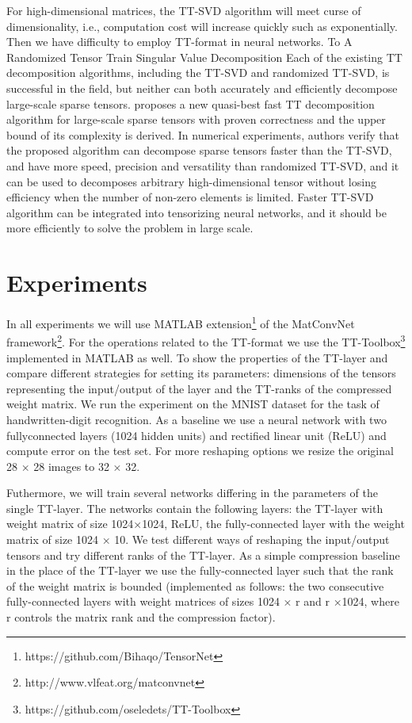 \documentclass[onecolumn, conference]{IEEEtran}
\begin{document}
\par For high-dimensional matrices, the TT-SVD algorithm will meet curse of dimensionality, i.e., computation cost will increase quickly such as exponentially. Then we have difficulty to employ TT-format in neural networks. To 
A Randomized Tensor Train Singular Value
Decomposition
Each of the existing TT decomposition algorithms,
including the TT-SVD and randomized TT-SVD, is successful in the field, but
neither can both accurately and efficiently decompose large-scale sparse tensors. \cite{b13} proposes a new quasi-best fast TT
decomposition algorithm for large-scale sparse tensors with proven correctness
and the upper bound of its complexity is derived. In numerical experiments,
authors verify that the proposed algorithm can decompose sparse tensors faster than
the TT-SVD, and have more speed, precision and versatility than randomized
TT-SVD\cite{b14}, and it can be used to decomposes arbitrary high-dimensional tensor
without losing efficiency when the number of non-zero elements is limited. 
Faster TT-SVD algorithm can be integrated into tensorizing neural networks, and it should be more efficiently to solve the problem in large scale.

\section{Experiments}
In all experiments we will use MATLAB extension\footnote{https://github.com/Bihaqo/TensorNet} of the MatConvNet framework\footnote{http://www.vlfeat.org/matconvnet}. For the operations related to the TT-format we use the TT-Toolbox\footnote{https://github.com/oseledets/TT-Toolbox} implemented in MATLAB as well.
To show the properties of the TT-layer and compare different strategies for setting its parameters: dimensions of the tensors representing the input/output of the layer and the TT-ranks of the compressed weight matrix. 
We run the experiment on the MNIST dataset for the task of handwritten-digit recognition. 
As a baseline we use a neural network with two fullyconnected layers (1024 hidden units) and rectiﬁed linear unit (ReLU) and compute error on the test set. 
For more reshaping options we resize the original 28 × 28 images to 32 × 32.

Futhermore, we will train several networks differing in the parameters of the single TT-layer. The networks contain the following layers: the TT-layer with weight matrix of size 1024×1024, ReLU, the fully-connected layer with the weight matrix of size 1024 × 10. 
We test different ways of reshaping the input/output tensors and try different ranks of the TT-layer. 
As a simple compression baseline in the place of the TT-layer we use the fully-connected layer such that the rank of the weight matrix is bounded (implemented as follows: the two consecutive fully-connected layers with weight matrices of sizes 1024 × r and r ×1024, where r controls the matrix rank and the compression factor). 
\end{document}
